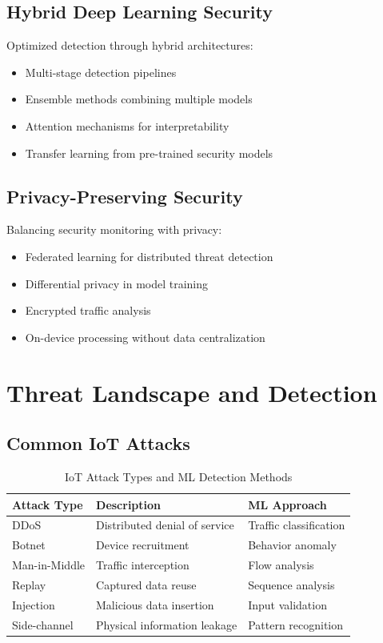 \documentclass[12pt,a4paper]{article}
\begin{document}
\subsection{Hybrid Deep Learning Security}

Optimized detection through hybrid architectures:
\begin{itemize}
    \item Multi-stage detection pipelines
    \item Ensemble methods combining multiple models
    \item Attention mechanisms for interpretability
    \item Transfer learning from pre-trained security models
\end{itemize}

\subsection{Privacy-Preserving Security}

Balancing security monitoring with privacy:
\begin{itemize}
    \item Federated learning for distributed threat detection
    \item Differential privacy in model training
    \item Encrypted traffic analysis
    \item On-device processing without data centralization
\end{itemize}

\section{Threat Landscape and Detection}

\subsection{Common IoT Attacks}

\begin{table}[H]
\centering
\caption{IoT Attack Types and ML Detection Methods}
\begin{tabular}{lll}
\toprule
\textbf{Attack Type} & \textbf{Description} & \textbf{ML Approach} \\
\midrule
DDoS & Distributed denial of service & Traffic classification \\
Botnet & Device recruitment & Behavior anomaly \\
Man-in-Middle & Traffic interception & Flow analysis \\
Replay & Captured data reuse & Sequence analysis \\
Injection & Malicious data insertion & Input validation \\
Side-channel & Physical information leakage & Pattern recognition \\
\bottomrule
\end{tabular}
\end{table}
\end{document}

